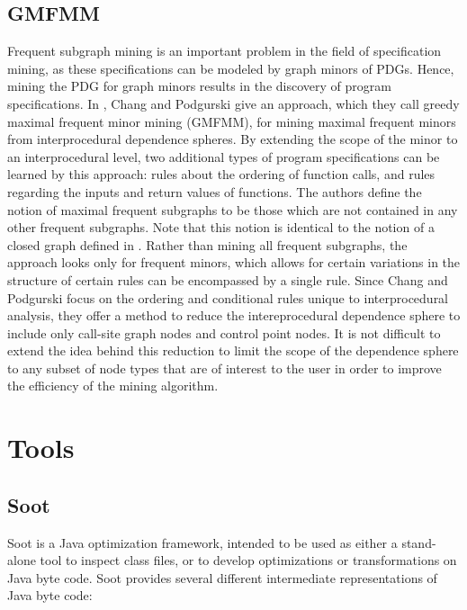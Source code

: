 \documentclass[12pt]{article}
\begin{document}
\subsection{GMFMM}
\noindent Frequent subgraph mining is an important problem in the field of
specification mining, as these specifications can be modeled by graph minors
of PDGs. Hence, mining the PDG for graph minors results in the discovery of
program specifications. In \cite{DBLP:journals/smr/ChangP12}, Chang and
Podgurski give an approach, which they call greedy maximal frequent minor
mining (GMFMM), for mining maximal frequent minors from interprocedural
dependence spheres. By extending the scope of the minor to an interprocedural
level, two additional types of program specifications can be learned by this
approach: rules about the ordering of function calls, and rules regarding the
inputs and return values of functions. The authors define the notion of
maximal frequent subgraphs to be those which are not contained in any other
frequent subgraphs. Note that this notion is identical to the notion of a
closed graph defined in \cite{Yan:2003:CMC:956750.956784}. Rather than mining
all frequent subgraphs, the approach looks only for frequent minors, which
allows for certain variations in the structure of certain rules can be
encompassed by a single rule. Since Chang and Podgurski focus on the ordering
and conditional rules unique to interprocedural analysis, they offer a method
to reduce the intereprocedural dependence sphere to include only call-site
graph nodes and control point nodes. It is not difficult to extend the idea
behind this reduction to limit the scope of the dependence sphere to any
subset of node types that are of interest to the user in order to improve the
efficiency of the mining algorithm.

\section{Tools}
\label{section:Tools and Data Sources}
\subsection{Soot}
Soot is a Java optimization framework, intended to be used as either a stand-alone tool to inspect class files, or to develop optimizations or transformations on Java byte code. Soot provides several different intermediate representations of Java byte code: 
\end{document}
